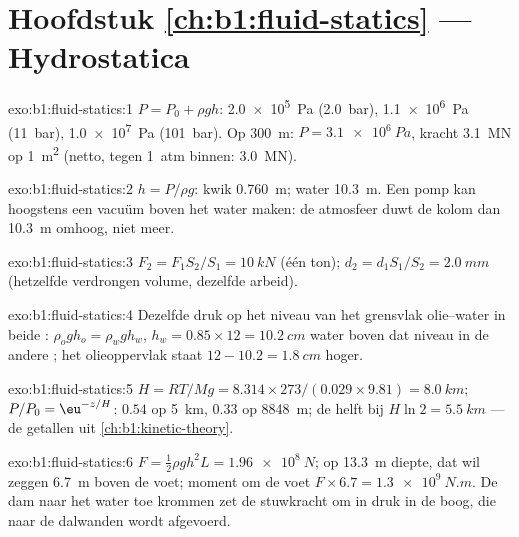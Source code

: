 \section*{Hoofdstuk \ref{ch:b1:fluid-statics} --- Hydrostatica}

\begin{solution}{exo:b1:fluid-statics:1}
$P = P_0 + \rho gh$: \qty{2.0e5}{Pa} (\qty{2.0}{bar}), \qty{1.1e6}{Pa}
(\qty{11}{bar}), \qty{1.0e7}{Pa} (\qty{101}{bar}). Op \qty{300}{m}: $P =
\qty{3.1e6}{Pa}$, kracht \qty{3.1}{MN} op \qty{1}{m^2} (netto, tegen
\qty{1}{atm} binnen: \qty{3.0}{MN}).
\end{solution}

\begin{solution}{exo:b1:fluid-statics:2}
$h = P/\rho g$: kwik \qty{0.760}{m}; water \qty{10.3}{m}. Een pomp kan hoogstens
een vacuüm boven het water maken: de atmosfeer duwt de kolom dan
\qty{10.3}{m} omhoog, niet meer.
\end{solution}

\begin{solution}{exo:b1:fluid-statics:3}
$F_2 = F_1S_2/S_1 = \qty{10}{kN}$ (één ton); $d_2 = d_1S_1/S_2 = \qty{2.0}{mm}$
(hetzelfde verdrongen volume, dezelfde arbeid).
\end{solution}

\begin{solution}{exo:b1:fluid-statics:4}
Dezelfde druk op het niveau van het grensvlak olie--water in beide : $\rho_og
h_o = \rho_wgh_w$, $h_w = 0.85 \times 12 = \qty{10.2}{cm}$ water boven
dat niveau in de andere ; het olieoppervlak staat $12 - 10.2 = \qty{1.8}{cm}$
hoger.
\end{solution}

\begin{solution}{exo:b1:fluid-statics:5}
$H = RT/Mg = 8.314 \times 273/(0.029 \times 9.81) = \qty{8.0}{km}$; $P/P_0 =
\eu^{-z/H}$: $0.54$ op \qty{5}{km}, $0.33$ op \qty{8848}{m}; de helft bij $H\ln2 =
\qty{5.5}{km}$ --- de getallen uit \cref{ch:b1:kinetic-theory}.
\end{solution}

\begin{solution}{exo:b1:fluid-statics:6}
$F = \tfrac12\rho gh^2L = \qty{1.96e8}{N}$;  op \qty{13.3}{m}
diepte, dat wil zeggen \qty{6.7}{m} boven de voet; moment om de voet $F \times
6.7 = \qty{1.3e9}{N.m}$. De dam naar het water toe krommen zet de stuwkracht
om in druk in de boog, die naar de dalwanden wordt afgevoerd.
\end{solution}


